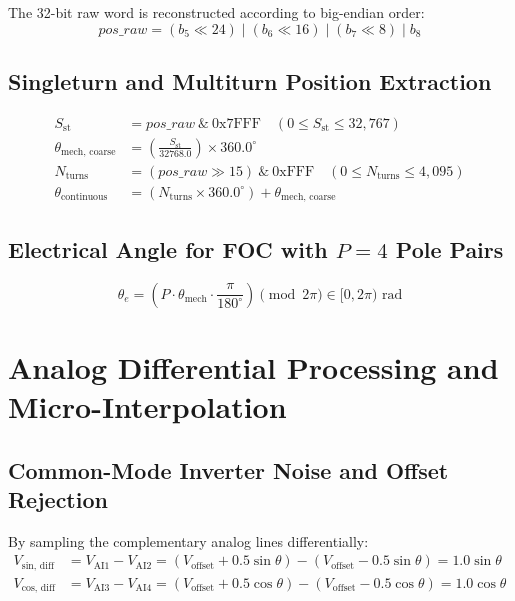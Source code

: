 \documentclass[11pt,a4paper]{article}
\begin{document}
The 32-bit raw word is reconstructed according to big-endian order:
\begin{equation}
pos\_raw = (b_5 \ll 24) \mid (b_6 \ll 16) \mid (b_7 \ll 8) \mid b_8
\end{equation}

\subsection{Singleturn and Multiturn Position Extraction}
\begin{align}
S_{\text{st}} &= pos\_raw \ \& \ \text{0x7FFF} \quad (0 \le S_{\text{st}} \le 32,767) \\
\theta_{\text{mech, coarse}} &= \left( \frac{S_{\text{st}}}{32768.0} \right) \times 360.0^\circ \\
N_{\text{turns}} &= (pos\_raw \gg 15) \ \& \ \text{0xFFF} \quad (0 \le N_{\text{turns}} \le 4,095) \\
\theta_{\text{continuous}} &= (N_{\text{turns}} \times 360.0^\circ) + \theta_{\text{mech, coarse}}
\end{align}

\subsection{Electrical Angle for FOC with $P=4$ Pole Pairs}
\begin{equation}
\theta_e = \left( P \cdot \theta_{\text{mech}} \cdot \frac{\pi}{180^\circ} \right) \pmod{2\pi} \in [0, 2\pi)\text{ rad}
\end{equation}

\section{Analog Differential Processing and Micro-Interpolation}

\subsection{Common-Mode Inverter Noise and Offset Rejection}
By sampling the complementary analog lines differentially:
\begin{align}
V_{\text{sin, diff}} &= V_{\text{AI1}} - V_{\text{AI2}} = (V_{\text{offset}} + 0.5\sin\theta) - (V_{\text{offset}} - 0.5\sin\theta) = 1.0\sin\theta \\
V_{\text{cos, diff}} &= V_{\text{AI3}} - V_{\text{AI4}} = (V_{\text{offset}} + 0.5\cos\theta) - (V_{\text{offset}} - 0.5\cos\theta) = 1.0\cos\theta
\end{align}
\end{document}
